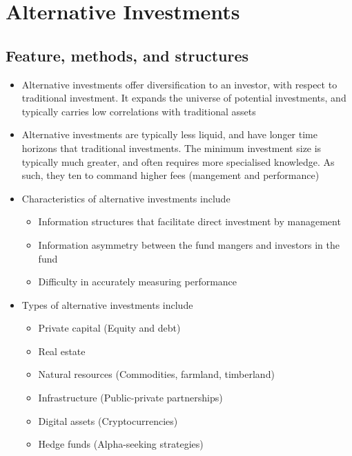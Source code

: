 \documentclass[../notes_compiled.tex]{subfiles}
\begin{document}
\section{Alternative Investments}

\subsection{Feature, methods, and structures}
\begin{itemize}
\item Alternative investments offer diversification to an investor, with respect to traditional investment. It expands the universe of potential investments, and typically carries low correlations with traditional assets
\item Alternative investments are typically less liquid, and have longer time horizons that traditional investments. The minimum investment size is typically much greater, and often requires more specialised knowledge. As such, they ten to command higher fees (mangement and performance)

\item Characteristics of alternative investments include
\begin{itemize}
\item Information structures that facilitate direct investment by management
\item Information asymmetry between the fund mangers and investors in the fund
\item Difficulty in accurately measuring performance
\end{itemize}

\item Types of alternative investments include
\begin{itemize}
\item Private capital (Equity and debt)
\item Real estate
\item Natural resources (Commodities, farmland, timberland)
\item Infrastructure (Public-private partnerships)
\item Digital assets (Cryptocurrencies)
\item Hedge funds (Alpha-seeking strategies)
\end{itemize}


\end{itemize}
\end{document}
